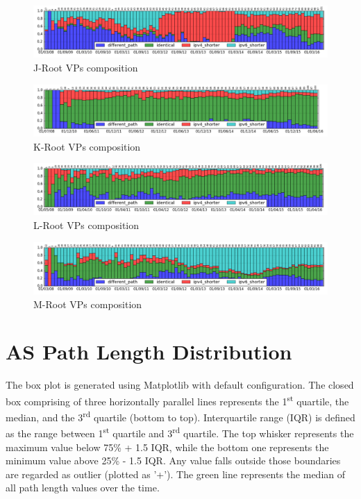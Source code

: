 \begin{appendices}
\begin{figure}[!htb]
	\end{figure}
	\begin{figure}[!htb]
		\centering
		\includegraphics[width=6.0in]{img/peer_composition_j.png}
		\caption{J-Root VPs composition}
		\label{fig:peer-comp-j}
	\end{figure}
	\begin{figure}[!htb]
		\centering
		\includegraphics[width=6.0in]{img/peer_composition_k.png}
		\caption{K-Root VPs composition}
		\label{fig:peer-comp-k}
	\end{figure}
	\begin{figure}[!htb]
		\centering
		\includegraphics[width=6.0in]{img/peer_composition_l.png}
		\caption{L-Root VPs composition}
		\label{fig:peer-comp-l}
	\end{figure}
	\begin{figure}[!htb]
		\centering
		\includegraphics[width=6.0in]{img/peer_composition_m.png}
		\caption{M-Root VPs composition}
		\label{fig:peer-comp-m}
	\end{figure}
	
	\chapter{AS Path Length Distribution}
	\label{app:path-avg}
	
	The box plot is generated using Matplotlib with default configuration. The closed box comprising of three horizontally parallel lines represents the 1\textsuperscript{st} quartile, the median, and the 3\textsuperscript{rd} quartile (bottom to top). Interquartile range (IQR) is defined as the range between 1\textsuperscript{st} quartile and 3\textsuperscript{rd} quartile. The top whisker represents the maximum value below 75\% + 1.5 IQR, while the bottom one represents the minimum value above 25\% - 1.5 IQR. Any value falls outside those boundaries are regarded as outlier (plotted as '+'). The green line represents the median of all path length values over the time.
	

\end{appendices}

